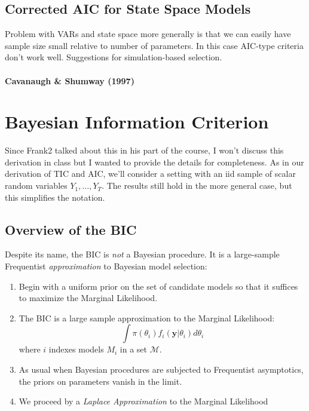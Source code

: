 \documentclass[12pt]{article}
\theoremstyle{definition}
\begin{document}
\subsection{Corrected AIC for State Space Models}
Problem with VARs and state space more generally is that we can easily have sample size small relative to number of parameters. In this case AIC-type criteria don't work well. Suggestions for simulation-based selection.

\paragraph{Cavanaugh \& Shumway (1997)} 

\paragraph{}
 


\section{Bayesian Information Criterion}
Since Frank2 talked about this in his part of the course, I won't discuss this derivation in class but I wanted to provide the details for completeness. As in our derivation of TIC and AIC, we'll consider a setting with an iid sample of scalar random variables $Y_1, \hdots, Y_T$. The results still hold in the more general case, but this simplifies the notation. 

\subsection{Overview of the BIC}
Despite its name, the BIC is \emph{not} a Bayesian procedure. It is a large-sample Frequentist \emph{approximation} to Bayesian model selection:
	\begin{enumerate}
		\item Begin with a uniform prior on the set of candidate models so that it suffices to maximize the Marginal Likelihood.
		\item The BIC is a large sample approximation to the Marginal Likelihood:
		$$\int \pi(\theta_i)f_i(\mathbf{y}|\theta_i)d\theta_i$$
		where $i$ indexes models $M_i$ in a set $\mathcal{M}$.
		\item As usual when Bayesian procedures are subjected to Frequentist asymptotics, the priors on parameters vanish in the limit.
		\item We proceed by a \emph{Laplace Approximation} to the Marginal Likelihood
	\end{enumerate}
\end{document}
